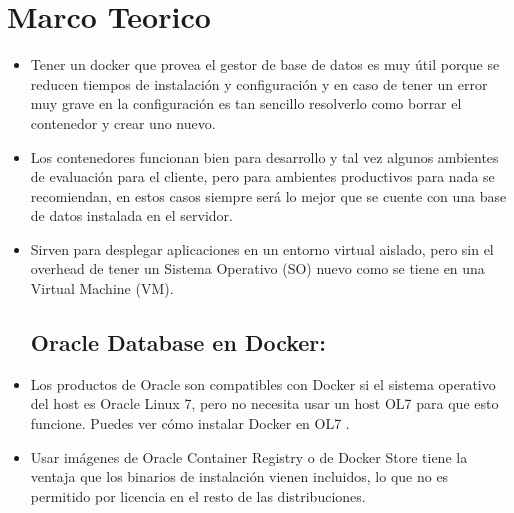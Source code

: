 \section{Marco Teorico} 

\begin{itemize}
\subsection{ Docker:}
	\item Tener un docker que provea el gestor de base de datos es muy útil porque se reducen tiempos de instalación y configuración y en caso de tener un error muy grave en la configuración es tan sencillo resolverlo como borrar el contenedor y crear uno nuevo.
          \item Los contenedores funcionan bien para desarrollo y tal vez algunos ambientes de evaluación para el cliente, pero para ambientes productivos para nada se recomiendan, en estos casos siempre será lo mejor que se cuente con una base de datos instalada en el servidor.
         \item Sirven para desplegar aplicaciones en un entorno virtual aislado, pero sin el overhead de tener un Sistema Operativo (SO) nuevo como se tiene en una Virtual Machine (VM).

\subsection{Oracle Database en Docker:}
	\item Los productos de Oracle son compatibles con Docker si el sistema operativo del host es Oracle Linux 7, pero no necesita usar un host OL7 para que esto funcione. Puedes ver cómo instalar Docker en OL7 .
	\item Usar imágenes de Oracle Container Registry o de Docker Store tiene la ventaja que los binarios de instalación vienen incluidos, lo que no es permitido por licencia en el resto de las distribuciones. 


\end{itemize}







